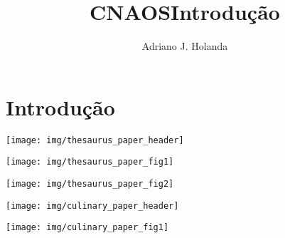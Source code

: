 \documentclass[ignorenonframetext]{beamer}
\begin{document}
\begin{frame}
\title{CNAOS}
\author{Adriano J. Holanda}
\maketitle
\end{frame}

\section{Introdução}
\label{sec:intro}

\begin{frame}[plain]
\title{\LARGE Introdução}
\author{}
\date{\empty}
\maketitle
\end{frame}


\begin{frame}
\texttt{[image: img/thesaurus\_paper\_header]}
\end{frame}

\begin{frame}
\texttt{[image: img/thesaurus\_paper\_fig1]}
\end{frame}

\begin{frame}
\texttt{[image: img/thesaurus\_paper\_fig2]}
\end{frame}




 \begin{frame}
 \texttt{[image: img/culinary\_paper\_header]}
 \end{frame}


\begin{frame}
\texttt{[image: img/culinary\_paper\_fig1]}
\end{frame}
\end{document}
